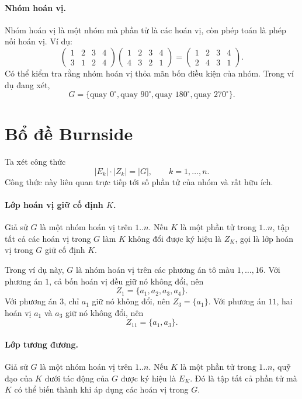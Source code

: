 \documentclass[11pt]{article}
\begin{document}
\paragraph{Nhóm hoán vị.}
Nhóm hoán vị là một nhóm mà phần tử là các hoán vị, còn phép toán là phép nối
hoán vị. Ví dụ:
\[
\begin{pmatrix}
1&2&3&4\\
3&1&2&4
\end{pmatrix}
\begin{pmatrix}
1&2&3&4\\
4&3&2&1
\end{pmatrix}
=
\begin{pmatrix}
1&2&3&4\\
2&4&3&1
\end{pmatrix}.
\]
Có thể kiểm tra rằng nhóm hoán vị thỏa mãn bốn điều kiện của nhóm. Trong ví
dụ đang xét,
\[
  G=\{\text{quay }0^\circ,\text{quay }90^\circ,
       \text{quay }180^\circ,\text{quay }270^\circ\}.
\]

\section{Bổ đề Burnside}

Ta xét công thức
\[
  |E_k|\cdot |Z_k|=|G|,\qquad k=1,\ldots,n.
\]
Công thức này liên quan trực tiếp tới số phần tử của nhóm và rất hữu ích.

\paragraph{Lớp hoán vị giữ cố định \(K\).}
Giả sử \(G\) là một nhóm hoán vị trên \(1..n\). Nếu \(K\) là một phần tử trong
\(1..n\), tập tất cả các hoán vị trong \(G\) làm \(K\) không đổi được ký hiệu
là \(Z_K\), gọi là lớp hoán vị trong \(G\) giữ cố định \(K\).

Trong ví dụ này, \(G\) là nhóm hoán vị trên các phương án tô màu
\(1,\ldots,16\). Với phương án \(1\), cả bốn hoán vị đều giữ nó không đổi, nên
\[
  Z_1=\{a_1,a_2,a_3,a_4\}.
\]
Với phương án \(3\), chỉ \(a_1\) giữ nó không đổi, nên \(Z_3=\{a_1\}\). Với
phương án \(11\), hai hoán vị \(a_1\) và \(a_3\) giữ nó không đổi, nên
\[
  Z_{11}=\{a_1,a_3\}.
\]

\paragraph{Lớp tương đương.}
Giả sử \(G\) là một nhóm hoán vị trên \(1..n\). Nếu \(K\) là một phần tử trong
\(1..n\), quỹ đạo của \(K\) dưới tác động của \(G\) được ký hiệu là \(E_K\).
Đó là tập tất cả phần tử mà \(K\) có thể biến thành khi áp dụng các hoán vị
trong \(G\).
\end{document}
